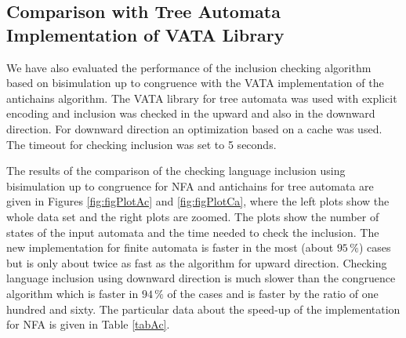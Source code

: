 \subsection{Comparison with Tree Automata Implementation of VATA Library}
We have also evaluated the performance of the inclusion checking algorithm based on bisimulation up to congruence with the VATA implementation of the antichains
algorithm.
The VATA library for tree automata was used with explicit encoding and inclusion was checked in the upward and also in the downward direction. 
For downward direction an optimization based on a cache was used. The timeout for checking inclusion was set to 5 seconds.

The results of the comparison of the checking language inclusion using bisimulation up to congruence for NFA and antichains for tree automata 
are given in Figures \ref{fig:figPlotAc} and \ref{fig:figPlotCa}, where the left plots show the whole data set and the right plots are zoomed. 
The plots show the number of states of the input
automata and the time needed to check the inclusion. The new implementation for finite automata is faster in the
most (about $95\,\%$) cases but is only about twice as fast as the algorithm for upward direction. 
Checking language inclusion using downward direction is much slower than 
the congruence algorithm which is faster in $94\,\%$ of the cases  and is faster by the ratio of one hundred and sixty. The particular data about the speed-up 
of the implementation for NFA is given in Table \ref{tabAc}.

